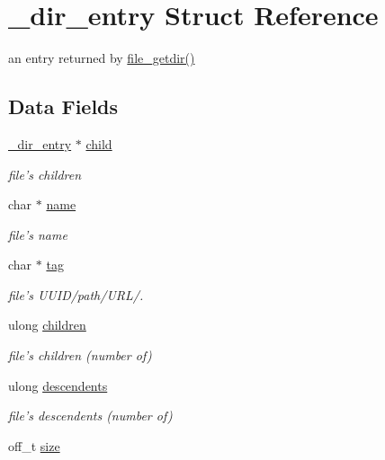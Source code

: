 \hypertarget{struct__dir__entry}{
\section{\_\-dir\_\-entry Struct Reference}
\label{struct__dir__entry}
}
an entry returned by \hyperlink{file_8c_a41}{file\_\-getdir()}  


\subsection*{Data Fields}
\begin{CompactItemize}
\item 
\hypertarget{struct__dir__entry_o0}{
\hyperlink{struct__dir__entry}{\_\-dir\_\-entry} $\ast$ \hyperlink{struct__dir__entry_o0}{child}}
\label{struct__dir__entry_o0}

\begin{CompactList}\small\item\em file's children \item\end{CompactList}\item 
\hypertarget{struct__dir__entry_o1}{
char $\ast$ \hyperlink{struct__dir__entry_o1}{name}}
\label{struct__dir__entry_o1}

\begin{CompactList}\small\item\em file's name \item\end{CompactList}\item 
char $\ast$ \hyperlink{struct__dir__entry_o2}{tag}
\begin{CompactList}\small\item\em file's UUID/path/URL/. \item\end{CompactList}\item 
\hypertarget{struct__dir__entry_o3}{
ulong \hyperlink{struct__dir__entry_o3}{children}}
\label{struct__dir__entry_o3}

\begin{CompactList}\small\item\em file's children (number of) \item\end{CompactList}\item 
\hypertarget{struct__dir__entry_o4}{
ulong \hyperlink{struct__dir__entry_o4}{descendents}}
\label{struct__dir__entry_o4}

\begin{CompactList}\small\item\em file's descendents (number of) \item\end{CompactList}\item 
\hypertarget{struct__dir__entry_o5}{
off\_\-t \hyperlink{struct__dir__entry_o5}{size}}
\label{struct__dir__entry_o5}


\end{CompactItemize}
